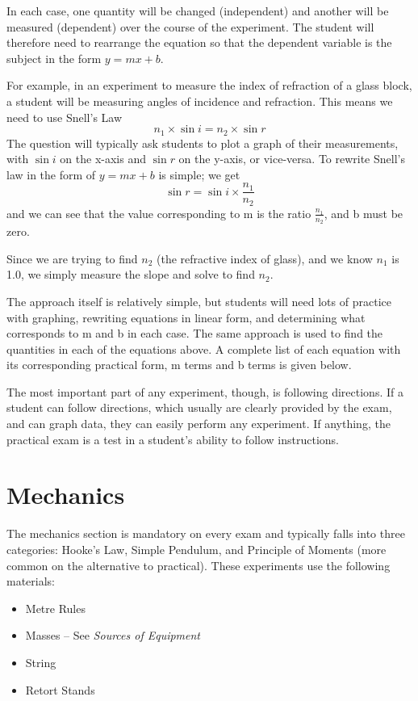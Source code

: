 In each case, one quantity will be changed (independent) and another will be
measured (dependent) over the course of the experiment. The student will therefore need
to rearrange the equation so that the dependent variable is the subject in the form $y = mx + b$.

For example, in an experiment to measure the index of refraction of a glass block, a
student will be measuring angles of incidence and refraction. This means we need to use
Snell’s Law $$n_1 \times \sin{i} = n_2 \times \sin{r}$$
The question will typically ask students to plot a graph of their measurements, with $\sin{i}$
on the x-axis and $\sin{r}$ on the y-axis, or vice-versa. To rewrite Snell’s law in the form of
$y = mx + b$ is simple; we get $$\sin{r} = \sin{i} \times \frac{n_1}{n_2}$$
and we can see that the value corresponding to m is the ratio $\frac{n_1}{n_2}$, and b must be zero.

Since we are trying to find $n_2$ (the refractive index of glass), and we know $n_1$ is 1.0, we
simply measure the slope and solve to find $n_2$.

The approach itself is relatively simple, but students will need lots of practice
with graphing, rewriting equations in linear form, and determining what corresponds to m
and b in each case. The same approach is used to find the quantities in each of the
equations above. A complete list of each equation with its corresponding practical form,
m terms and b terms is given below.


The most important part of any experiment, though, is following directions. If a
student can follow directions, which usually are clearly provided by the exam, and can
graph data, they can easily perform any experiment. If anything, the practical exam is a
test in a student’s ability to follow instructions.

\section{Mechanics}

The mechanics section is mandatory on every exam and typically falls into three
categories: Hooke’s Law, Simple Pendulum, and Principle of Moments (more common
on the alternative to practical). These experiments use the following materials:
\begin{itemize}
\item{Metre Rules}
\item{Masses – See \textit{Sources of Equipment}}
\item{String}
\item{Retort Stands}
\end{itemize}

